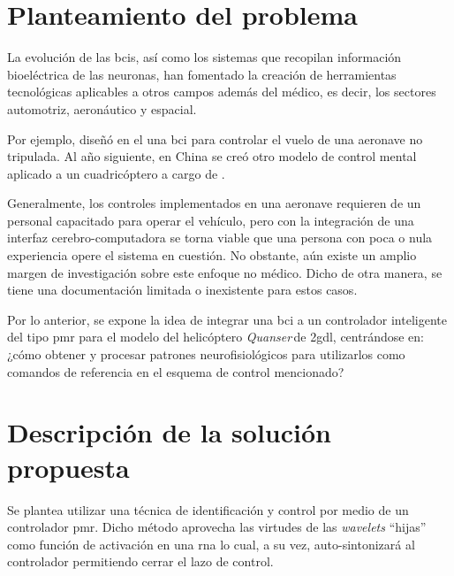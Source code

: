 \label{chap:intro}


\section{Planteamiento del problema}

    La evolución de las \glspl{bci}, así como los sistemas que recopilan información bioeléctrica de las neuronas, han fomentado la creación de herramientas tecnológicas aplicables a otros campos además del médico, es decir, los sectores automotriz, aeronáutico y espacial.
    
    Por ejemplo, \citeauthor{MamaniMusaja2018} \cite{MamaniMusaja2018} diseñó en el \citeyear{MamaniMusaja2018} una \acrlong{bci} para controlar el vuelo de una aeronave no tripulada. Al año siguiente, en China se creó otro modelo de control mental aplicado a un cuadricóptero a cargo de \citeauthor{Duan2019} \cite{Duan2019}.
    
    Generalmente, los controles implementados en una aeronave requieren de un personal capacitado para operar el vehículo, pero con la integración de una interfaz cerebro-computadora se torna viable que una persona con poca o nula experiencia opere el sistema en cuestión. No obstante, aún existe un amplio margen de investigación sobre este enfoque no médico. Dicho de otra manera, se tiene una documentación limitada o inexistente para estos casos.
    
    Por lo anterior, se expone la idea de integrar una \acrlong{bci} a un controlador inteligente del tipo \acrfull{pmr} para el modelo del helicóptero \textit{Quanser}\textregistered\,de \acrfull{2gdl}, centrándose en: ¿cómo obtener y procesar patrones neurofisiológicos para utilizarlos como comandos de referencia en el esquema de control mencionado?

\section{Descripción de la solución propuesta}

    Se plantea utilizar una técnica de identificación y control por medio de un controlador \acrlong{pmr}. Dicho método aprovecha las virtudes de las \textit{wavelets} ``hijas'' como función de activación en una \acrlong{rna} lo cual, a su vez, auto-sintonizará al controlador permitiendo cerrar el lazo de control.
    
